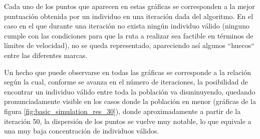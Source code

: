\documentclass[11pt,spanish,listoffigures,listoftables]{tfgetsinf}
\begin{document}
Cada uno de los puntos que aparecen en estas gráficas se corresponden a la mejor puntuación obtenida por un individuo en una iteración dada del algoritmo. En el caso en el que durante una iteración no exista ningún individuo válido (ninguno cumple con las condiciones para que la ruta a realizar sea factible en términos de límites de velocidad), no se queda representado, apareciendo así algunos ``huecos`` entre las diferentes marcas.

Un hecho que puede observarse en todas las gráficas se corresponde a la relación según la cual, conforme se avanza en el número de iteraciones, la posibilidad de encontrar un individuo válido entre toda la población va disminuyendo, quedando pronunciadamente visible en los casos donde la población en menor (gráficas de la figura \ref{fig:basic_simulation_res_30}), donde aproximadamente a partir de la iteración 50, la dispersión de los puntos se vuelve muy notable, lo que equivale a una muy baja concentración de individuos válidos.
\end{document}

